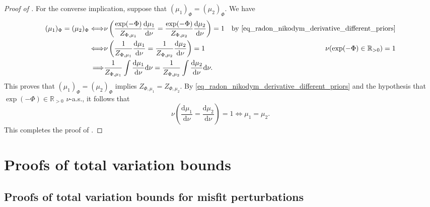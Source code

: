 \documentclass[a4paper]{scrartcl}
\theoremstyle{definition}
\numberwithin{equation}{section}
\newcommand{\R}{\mathbb{R}}
\newcommand{\rd}{\mathrm{d}}
\begin{document}
\begin{proof}[Proof of ]
 For the converse implication, suppose that $(\mu_1)_\Phi=(\mu_2)_\Phi$. We have
\begin{align*}
 (\mu_1)_\Phi=(\mu_2)_\Phi \Longleftrightarrow & \nu\left(\frac{\exp(-\Phi)}{Z_{\Phi,\mu_1}}\frac{\rd \mu_1}{\rd \nu}=\frac{\exp(-\Phi)}{Z_{\Phi,\mu_2}}\frac{\rd \mu_2}{\rd \nu}\right)=1 & \text{by \eqref{eq_radon_nikodym_derivative_different_priors}}
 \\
 \Longleftrightarrow &  \nu\left(\frac{1}{Z_{\Phi,\mu_1}}\frac{\rd \mu_1}{\rd \nu}=\frac{1}{Z_{\Phi,\mu_2}}\frac{\rd \mu_2}{\rd \nu}\right)=1 & \nu(\exp(-\Phi)\in\R_{>0})=1
 \\
 \Longrightarrow& \frac{1}{Z_{\Phi,\mu_1}}\int \frac{\rd \mu_1}{\rd \nu}\rd \nu=\frac{1}{Z_{\Phi,\mu_2}}\int \frac{\rd \mu_2}{\rd \nu}\rd\nu.
\end{align*}
This proves that $(\mu_1)_\Phi=(\mu_2)_\Phi$ implies $Z_{\Phi,\mu_1}=Z_{\Phi,\mu_2}$. By \eqref{eq_radon_nikodym_derivative_different_priors} and the hypothesis that $\exp(-\Phi)\in\R_{>0}$ $\nu$-a.s., it follows that 
\begin{equation*}
 \nu\left(\frac{\rd\mu_1}{\rd\nu}=\frac{\rd\mu_2}{\rd\nu}\right)=1 \Longleftrightarrow \mu_1=\mu_2.
\end{equation*}
This completes the proof of .
\end{proof}



\section{Proofs of total variation bounds}
\label{section_TVbounds_proofs}

\subsection{Proofs of total variation bounds for misfit perturbations}
\label{section_TVbounds_Misfitperturbations_proofs}
\end{document}
